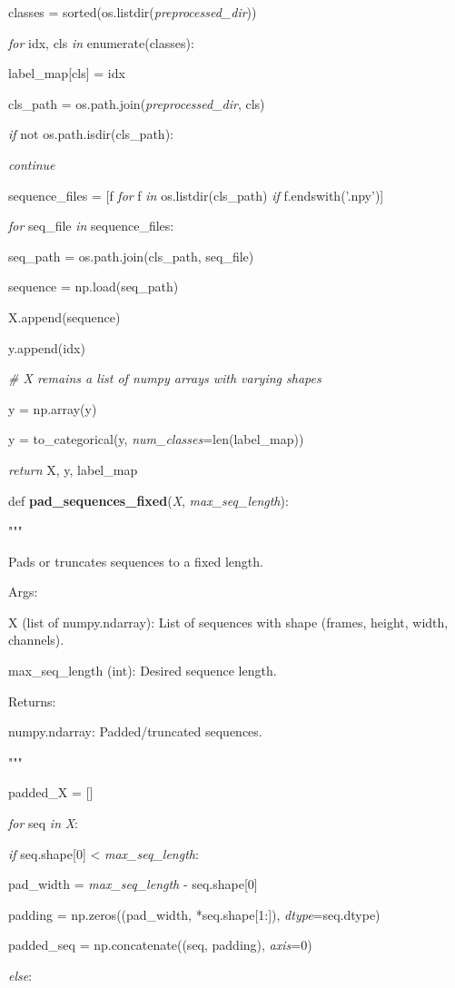 \documentclass[
]{article}
\begin{document}
classes = sorted(os.listdir(\emph{preprocessed\_dir}))

\emph{for} idx, cls \emph{in} enumerate(classes):

label\_map{[}cls{]} = idx

cls\_path = os.path.join(\emph{preprocessed\_dir}, cls)

\emph{if} not os.path.isdir(cls\_path):

\emph{continue}

sequence\_files = {[}f \emph{for} f \emph{in} os.listdir(cls\_path) \emph{if} f.endswith('.npy'){]}

\emph{for} seq\_file \emph{in} sequence\_files:

seq\_path = os.path.join(cls\_path, seq\_file)

sequence = np.load(seq\_path)

X.append(sequence)

y.append(idx)

\emph{\# X remains a list of numpy arrays with varying shapes}

y = np.array(y)

y = to\_categorical(y, \emph{num\_classes}=len(label\_map))

\emph{return} X, y, label\_map

def \textbf{pad\_sequences\_fixed}(\emph{X}, \emph{max\_seq\_length}):

"""

Pads or truncates sequences to a fixed length.

Args:

X (list of numpy.ndarray): List of sequences with shape (frames, height, width, channels).

max\_seq\_length (int): Desired sequence length.

Returns:

numpy.ndarray: Padded/truncated sequences.

"""

padded\_X = {[}{]}

\emph{for} seq \emph{in} \emph{X}:

\emph{if} seq.shape{[}0{]} \textless{} \emph{max\_seq\_length}:

pad\_width = \emph{max\_seq\_length} - seq.shape{[}0{]}

padding = np.zeros((pad\_width, *seq.shape{[}1:{]}), \emph{dtype}=seq.dtype)

padded\_seq = np.concatenate((seq, padding), \emph{axis}=0)

\emph{else}:
\end{document}
